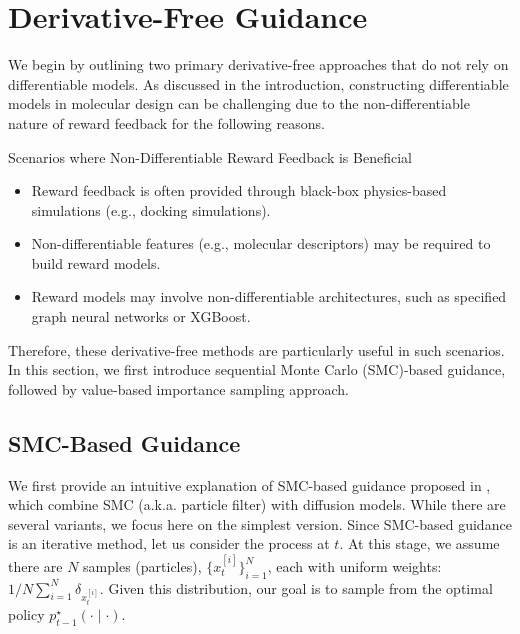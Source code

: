 \section{Derivative-Free Guidance}\label{sec:derivative_free}

We begin by outlining two primary derivative-free approaches that do not rely on differentiable models. As discussed in the introduction, constructing differentiable models in molecular design can be challenging due to the non-differentiable nature of reward feedback for the following reasons. 

\begin{AIbox}{
Scenarios where Non-Differentiable Reward Feedback is Beneficial}
\begin{itemize}
    \item Reward feedback is often provided through black-box physics-based simulations (e.g., docking simulations). 
    \item Non-differentiable features (e.g., molecular descriptors) may be required to build reward models.
    \item Reward models may involve non-differentiable architectures, such as specified graph neural networks or XGBoost.
\end{itemize}    
\end{AIbox}

Therefore, these derivative-free methods are particularly useful in such scenarios. In this section, we first introduce sequential Monte Carlo (SMC)-based guidance, followed by value-based importance sampling approach.

\subsection{SMC-Based Guidance}\label{sec:SMC}

We first provide an intuitive explanation of SMC-based guidance proposed in \citet{wu2024practical,dou2024diffusion,cardoso2023monte,phillips2024particle}, which combine SMC (a.k.a. particle filter) \citep{gordon1993novel,kitagawa1993monte,del2006sequential} with diffusion models. While there are several variants, we focus here on the simplest version. Since SMC-based guidance is an iterative method,  let us consider the process at $t$.  At this stage, we assume there are $N$ samples (particles), $\{x^{[i]}_{t}\}_{i=1}^N$, each with uniform weights: $
1/N\sum_{i=1}^N \delta_{x^{[i]}_{t}}. $
Given this distribution, our goal is to sample from the optimal policy $p^{\star}_{t-1}(\cdot \mid \cdot)$. 


